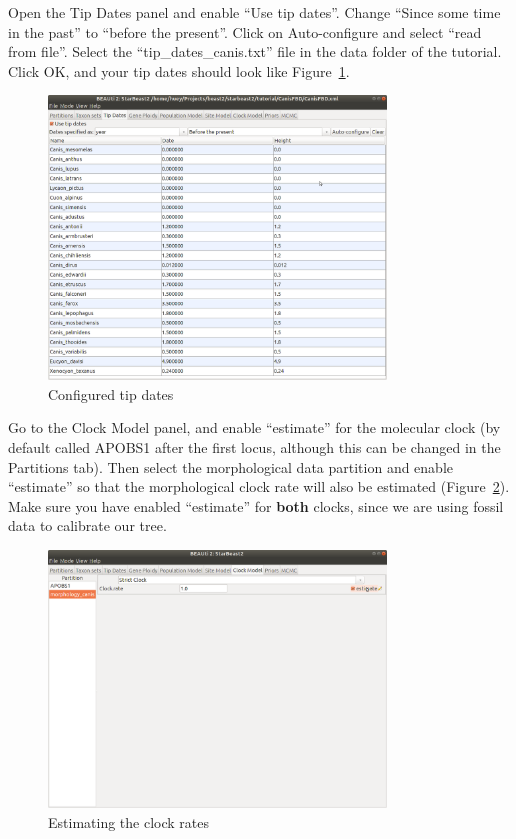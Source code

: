 \documentclass[12pt]{article}
\begin{document}
\clearpage

Open the Tip Dates panel and enable ``Use tip dates''. Change
``Since some time in the past'' to ``before the present''. Click
on Auto-configure and select ``read from file''. Select the
``tip\_dates\_canis.txt'' file in the data folder of the tutorial.
Click OK, and your tip dates should look like Figure~\ref{fig:tipDates}.

\begin{figure}[htb!]
\centering
\includegraphics[width=0.8\textwidth]{figures/tipDates.png}
\caption
{Configured tip dates}
\label{fig:tipDates}
\end{figure}

Go to the Clock Model panel, and enable ``estimate'' for the
molecular clock (by default called APOBS1 after the first locus, although
this can be changed in the Partitions tab). Then select the morphological
data partition and enable ``estimate'' so that the morphological
clock rate will also be estimated (Figure~\ref{fig:estimateMorphClock}).
Make sure you have enabled ``estimate'' for \textbf{both} clocks, since we
are using fossil data to calibrate our tree.

\begin{figure}[htb!]
\centering
\includegraphics[width=0.8\textwidth]{figures/estimateMorphClock.png}
\caption
{Estimating the clock rates}
\label{fig:estimateMorphClock}
\end{figure}
\end{document}
